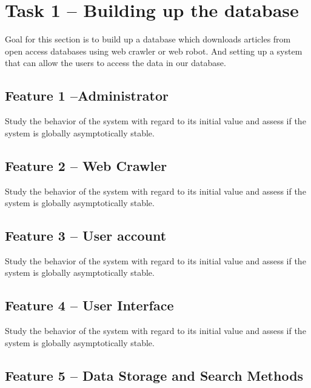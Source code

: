 \documentclass[a4paper]{article} %
\begin{document}
	
	
	
	\section*{Task 1 -- Building up the database}
	\label{task1}
	
	Goal for this section is to build up a database which downloads articles from open access databases using web crawler or web robot. And setting up a system that can allow the users to access the data in our database.
	
	\subsection*{Feature 1 --Administrator}
	\label{task1:feature1}
	
	Study the behavior of the system with regard to its initial value and assess if the system is globally asymptotically stable.
	
	\subsection*{Feature 2 -- Web Crawler}
	\label{task1:feature2}
	
	Study the behavior of the system with regard to its initial value and assess if the system is globally asymptotically stable.
	
	\subsection*{Feature 3 -- User account}
	\label{task1:feature3}
	
	Study the behavior of the system with regard to its initial value and assess if the system is globally asymptotically stable.
	
	\subsection*{Feature 4 -- User Interface}
	\label{task1:feature4}
	
	Study the behavior of the system with regard to its initial value and assess if the system is globally asymptotically stable.
	
	\subsection*{Feature 5 -- Data Storage and Search Methods}
	\label{task1:feature5}
	
\end{document}
